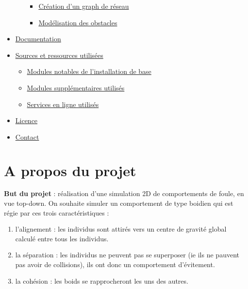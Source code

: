\documentclass[
]{article}
\providecommand{\tightlist}{%
  \setlength{\itemsep}{0pt}\setlength{\parskip}{0pt}}
\begin{document}
\begin{itemize}
\begin{itemize}
    \begin{itemize}
    \tightlist
    \item
      \protect\hyperlink{cruxe9ation-dun-graph-de-ruxe9seau}{Création
      d'un graph de réseau}
    \item
      \protect\hyperlink{moduxe9lisation-des-obstacles}{Modélisation des
      obstacles}
    \end{itemize}
  \end{itemize}
\item
  \protect\hyperlink{documentation}{Documentation}
\item
  \protect\hyperlink{sources-et-ressources-utilisuxe9es}{Sources et
  ressources utilisées}

  \begin{itemize}
  \tightlist
  \item
    \protect\hyperlink{modules-notables-de-linstallation-de-base}{Modules
    notables de l'installation de base}
  \item
    \protect\hyperlink{modules-suppluxe9mentaires-utilisuxe9s}{Modules
    supplémentaires utilisés}
  \item
    \protect\hyperlink{services-en-ligne-utilisuxe9s}{Services en ligne
    utilisés}
  \end{itemize}
\item
  \protect\hyperlink{licence}{Licence}
\item
  \protect\hyperlink{contact}{Contact}
\end{itemize}

\hypertarget{a-propos-du-projet}{%
\section{A propos du projet}\label{a-propos-du-projet}}

\textbf{But du projet} : réalisation d'une simulation 2D de
comportements de foule, en vue top-down. On souhaite simuler un
comportement de type boidien qui est régie par ces trois
caractéristiques :

\begin{enumerate}
\def\labelenumi{\arabic{enumi}.}
\tightlist
\item
  l'alignement : les individus sont attirés vers un centre de gravité
  global calculé entre tous les individus.
\item
  la séparation : les individus ne peuvent pas se superposer (ie ils ne
  pauvent pas avoir de collisions), ils ont donc un comportement
  d'évitement.
\item
  la cohésion : les boids se rapprocheront les uns des autres.
\end{enumerate}
\end{document}
